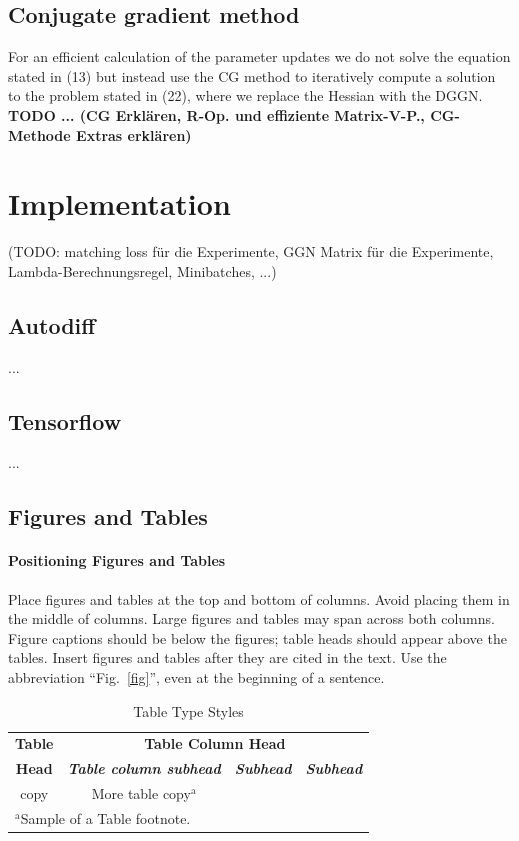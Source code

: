 \documentclass[conference]{IEEEtran}
\begin{document}
\subsection{Conjugate gradient method}
For an efficient calculation of the parameter updates we do not solve the equation stated in (13) but instead use the CG method to iteratively compute a solution to the problem stated in (22), where we replace the Hessian with the DGGN. 
\\\textbf{TODO ... (CG Erklären, R-Op. und effiziente Matrix-V-P., CG-Methode Extras erklären)}

\section {Implementation}
(TODO: matching loss für die Experimente, GGN Matrix für die Experimente, Lambda-Berechnungsregel, Minibatches, ...)
\subsection{Autodiff}
...
\subsection{Tensorflow}
...

\subsection{Figures and Tables}
\paragraph{Positioning Figures and Tables} Place figures and tables at the top and 
bottom of columns. Avoid placing them in the middle of columns. Large 
figures and tables may span across both columns. Figure captions should be 
below the figures; table heads should appear above the tables. Insert 
figures and tables after they are cited in the text. Use the abbreviation 
``Fig.~\ref{fig}'', even at the beginning of a sentence.

\begin{table}[htbp]
\caption{Table Type Styles}
\begin{center}
\begin{tabular}{|c|c|c|c|}
\hline
\textbf{Table}&\multicolumn{3}{|c|}{\textbf{Table Column Head}} \\
\cline{2-4} 
\textbf{Head} & \textbf{\textit{Table column subhead}}& \textbf{\textit{Subhead}}& \textbf{\textit{Subhead}} \\
\hline
copy& More table copy$^{\mathrm{a}}$& &  \\
\hline
\multicolumn{4}{l}{$^{\mathrm{a}}$Sample of a Table footnote.}
\end{tabular}
\label{tab1}
\end{center}
\end{table}
\end{document}
